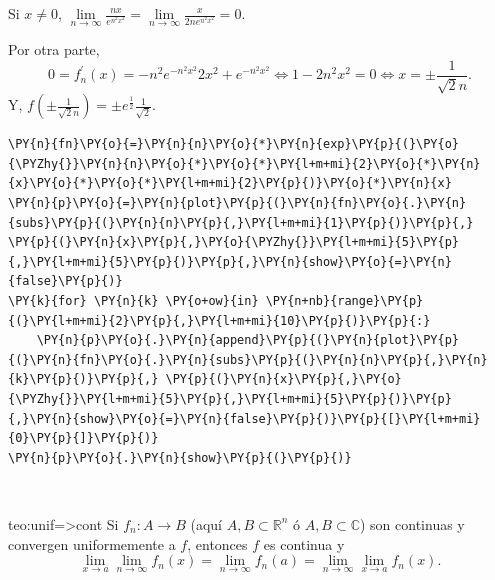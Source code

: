 \begin{ejemplo}{}
\begin{enumerate}
Si $x\neq 0$, $\lim\limits_{n\to \infty} \frac{nx}{e^{n^2x^2}}=\lim\limits_{n \to \infty} \frac{x}{2ne^{n^2x^2}}=0$.

Por otra parte, 
\[
0=f^{'}_n(x)=-n^2e^{-n^2 x^2}2x^2+e^{-n^2x^2}\Leftrightarrow 1-2n^2x^2=0 \Leftrightarrow x=\pm \frac{1}{\sqrt{2}n}.
\]
Y, $f\left(\pm\frac{1}{\sqrt{2}n}\right)=\pm e^{\frac{1}{2}}\frac{1}{\sqrt{2}}$.

    \begin{tcolorbox}[breakable, size=fbox, boxrule=1pt, pad at break*=1mm,colback=cellbackground, colframe=cellborder]
\begin{Verbatim}[commandchars=\\\{\}]
\PY{n}{fn}\PY{o}{=}\PY{n}{n}\PY{o}{*}\PY{n}{exp}\PY{p}{(}\PY{o}{\PYZhy{}}\PY{n}{n}\PY{o}{*}\PY{o}{*}\PY{l+m+mi}{2}\PY{o}{*}\PY{n}{x}\PY{o}{*}\PY{o}{*}\PY{l+m+mi}{2}\PY{p}{)}\PY{o}{*}\PY{n}{x}
\PY{n}{p}\PY{o}{=}\PY{n}{plot}\PY{p}{(}\PY{n}{fn}\PY{o}{.}\PY{n}{subs}\PY{p}{(}\PY{n}{n}\PY{p}{,}\PY{l+m+mi}{1}\PY{p}{)}\PY{p}{,} \PY{p}{(}\PY{n}{x}\PY{p}{,}\PY{o}{\PYZhy{}}\PY{l+m+mi}{5}\PY{p}{,}\PY{l+m+mi}{5}\PY{p}{)}\PY{p}{,}\PY{n}{show}\PY{o}{=}\PY{n}{false}\PY{p}{)}
\PY{k}{for} \PY{n}{k} \PY{o+ow}{in} \PY{n+nb}{range}\PY{p}{(}\PY{l+m+mi}{2}\PY{p}{,}\PY{l+m+mi}{10}\PY{p}{)}\PY{p}{:}
    \PY{n}{p}\PY{o}{.}\PY{n}{append}\PY{p}{(}\PY{n}{plot}\PY{p}{(}\PY{n}{fn}\PY{o}{.}\PY{n}{subs}\PY{p}{(}\PY{n}{n}\PY{p}{,}\PY{n}{k}\PY{p}{)}\PY{p}{,} \PY{p}{(}\PY{n}{x}\PY{p}{,}\PY{o}{\PYZhy{}}\PY{l+m+mi}{5}\PY{p}{,}\PY{l+m+mi}{5}\PY{p}{)}\PY{p}{,}\PY{n}{show}\PY{o}{=}\PY{n}{false}\PY{p}{)}\PY{p}{[}\PY{l+m+mi}{0}\PY{p}{]}\PY{p}{)}
\PY{n}{p}\PY{o}{.}\PY{n}{show}\PY{p}{(}\PY{p}{)}
\end{Verbatim}
\end{tcolorbox}

    \begin{center}
    \end{center}
    { \hspace*{\fill} \\}
\end{enumerate}
\end{ejemplo}


\begin{teorema}{teo:unif=>cont}
Si $f_n: A\to B$ (aquí $A,B \subset \mathbb{R}^n$ ó $A,B \subset \mathbb{C}$) 
son continuas y convergen uniformemente a $f$, entonces $f$ es continua y 
\[
\lim\limits_{x \to a}\lim\limits_{n \to \infty} f_n(x)=
\lim\limits_{n \to \infty} f_n(a)=
\lim\limits_{n \to \infty} \lim \limits_{x \to a} f_n(x).
\]
\end{teorema}

